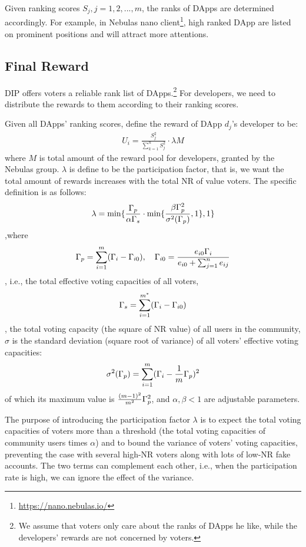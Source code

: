 Given ranking scores $S_j,j=1,2,...,m$, the ranks of DApps are determined accordingly. For example, in Nebulas nano client\footnote{\url{https://nano.nebulas.io/}}, high ranked DApp are listed on prominent positions and will attract more attentions.

\subsection{Final Reward}
DIP offers voters a reliable rank list of DApps.\footnote{We assume that voters only care about the ranks of DApps he like, while the developers' rewards are not concerned by voters.} For developers, we need to distribute the rewards to them according to their ranking scores. 

Given all DApps' ranking scores, define the reward of DApp $d_j$'s developer to be:
\begin{align}
	\label{eq:distribution}
	U_i = \frac{S_j^2}{\sum_{k=1}^n S_j^2}\cdot \lambda M
\end{align}
where $M$ is  total amount of the reward pool for developers, granted by the Nebulas group. $\lambda $ is define to be the participation factor, that is, we want the total amount of rewards increases with the total NR of value voters. The specific definition is as follows:
\begin{align}
	\lambda=\min\{\frac{\Gamma_p}{\alpha \Gamma_s }\cdot \min\{\frac{\beta\Gamma_p^2 }{\sigma^2(\Gamma_p)},1\},1\}
\end{align}
,where $$\Gamma_p = \sum_{i=1}^m (\Gamma_i-\Gamma_{i0}),~~~\Gamma_{i0} = \frac{e_{i0}\Gamma_i}{e_{i0}+\sum_{j=1}^n {e_{ij}}}$$, i.e., the total effective voting capacities of all voters, 
$$\Gamma_s = \sum_{i=1}^{m^*} (\Gamma_i-\Gamma_{i0})$$, 
the total voting capacity (the square of NR value) of all users in the community, $\sigma$ is the standard deviation (square root of variance) of all voters' effective voting capacities:
$$ \sigma^2(\Gamma_p) = \sum_{i=1}^m (\Gamma_i-\frac{1}{m}\Gamma_p)^2 $$
of which its maximum value is $\frac{(m-1)^2}{m^2}\Gamma_p^2$, and $\alpha,\beta < 1$ are adjustable parameters. 

The purpose of introducing the participation factor $\lambda$ is to expect the total voting capacities of voters more than a threshold (the total voting capacities of  community users times $\alpha$)  and to bound the variance of voters’ voting capacities, preventing the case with several high-NR voters along with lots of low-NR fake accounts. The two terms can complement each other, i.e., when the participation rate is high, we can ignore the effect of the variance. 
